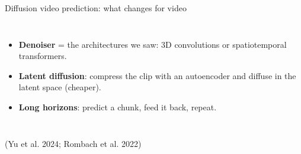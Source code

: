 \documentclass{beamer}
\begin{document}
\begin{frame}{Diffusion video prediction: what changes for video}
\begin{columns}[t]
        \begin{itemize}
            \item \textbf{Denoiser} = the architectures we saw: 3D convolutions or spatiotemporal transformers.
            \item \textbf{Latent diffusion}: compress the clip with an autoencoder and diffuse in the latent space (cheaper).
            \item \textbf{Long horizons}: predict a chunk, feed it back, repeat.
        \end{itemize}
    \end{columns}

    \vfill
    \hfill{\tiny (Yu et al. 2024; Rombach et al. 2022)}
\end{frame}

\end{document}
